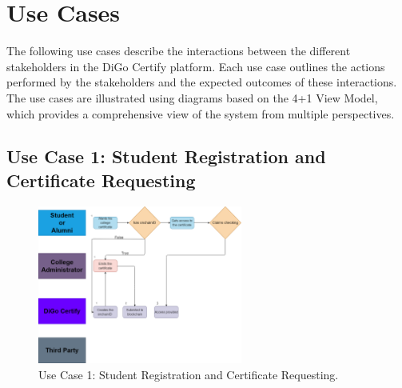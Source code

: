 \section{Use Cases}\label{sec:use-cases}

The following use cases describe the interactions between the different stakeholders in the DiGo Certify platform. Each use case outlines the actions performed by the stakeholders and the expected outcomes of these interactions. The use cases are illustrated using diagrams based on the 4+1 View Model, which provides a comprehensive view of the system from multiple perspectives\cite{4+1-architecture-viewmodel}.

\subsection{Use Case 1: Student Registration and Certificate Requesting}

\begin{figure}[H]
    \centering
    \includegraphics[width=0.6\textwidth, height=0.6\textheight, keepaspectratio]{./assets/certificate-requesting.drawio.png}
    \caption{Use Case 1: Student Registration and Certificate Requesting.}
    \label{fig:use-case-1}
\end{figure}

